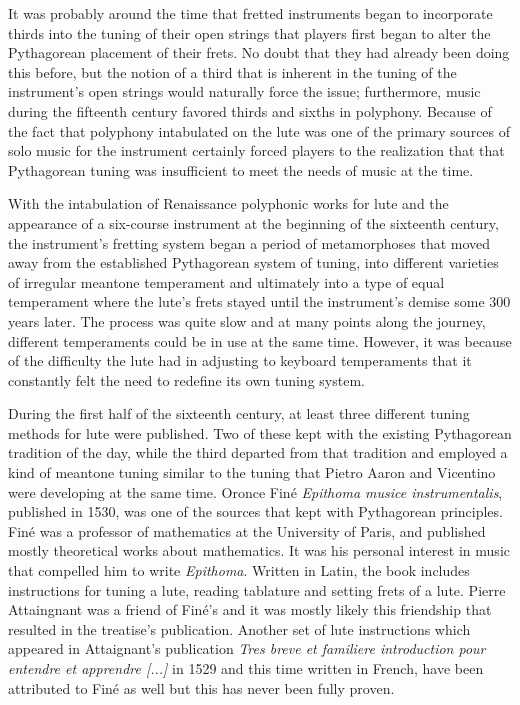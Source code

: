 It was probably around the time that fretted instruments began to incorporate
thirds into the tuning of their open strings that players first began to alter
the Pythagorean placement of their frets.  No doubt that they had
already been doing this before, but the notion of a third that is inherent in
the tuning of the instrument's open strings would naturally force the issue;
furthermore, music during the fifteenth century favored
thirds and sixths in polyphony. Because of the fact that polyphony
intabulated on the lute was one of the primary sources of solo music for the
instrument certainly forced players to the realization that that Pythagorean
tuning was insufficient to meet the needs of music at the time.

With the intabulation of Renaissance polyphonic works for lute and the
appearance of a six-course instrument at the beginning of the sixteenth century,
the instrument's fretting system began a period of metamorphoses that moved away
from the established Pythagorean system of tuning, into different varieties of
irregular meantone temperament and ultimately into a type of equal temperament
where the lute's frets stayed until the instrument's demise some 300 years
later.  The process was quite slow and at many points along the journey,
different temperaments could be in use at the same time.  However, it was
because of the difficulty the lute had in adjusting to keyboard temperaments
that it constantly felt the need to redefine its own tuning system.

During the first half of the sixteenth century, at least three different tuning
methods for lute were published.  Two of these kept with the existing
Pythagorean tradition of the day, while the third departed from that tradition
and employed a kind of meantone tuning similar to the tuning that Pietro Aaron
and Vicentino were developing at the same time.  Oronce Fin\'{e} \textit{Epithoma
musice instrumentalis}, published in 1530, was one of the sources that kept
with Pythagorean principles.  Fin\'{e} was a professor of mathematics at
the University of Paris, and published mostly theoretical works about mathematics.
It was his personal interest in music that compelled him to write \textit{Epithoma}.
Written in Latin, the book includes instructions for tuning a lute, reading
tablature and setting frets of a lute.  Pierre Attaingnant was a friend of
Fin\'{e}'s and it was mostly likely this friendship that resulted in
the treatise's publication.  Another set of lute instructions which appeared in
Attaignant's publication \textit{Tres breve et familiere introduction pour
entendre et apprendre [...]} in 1529 and this time written in French,
have been attributed to Fin\'{e} as well
but this has never been fully proven.\autocite[1]{PV:1}

